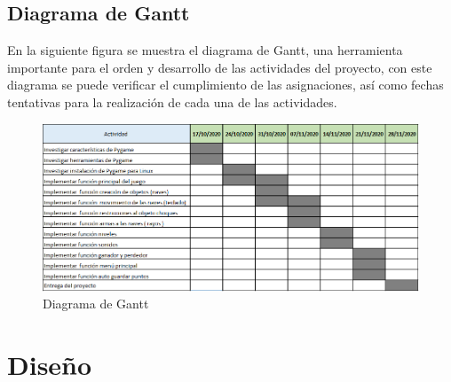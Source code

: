 \documentclass[12pt,letterpaper]{article}
\begin{document}
\subsection{Diagrama de Gantt} 
En la siguiente figura se muestra el diagrama de Gantt, una herramienta importante para el orden y desarrollo de las actividades del proyecto, con este diagrama se puede verificar el cumplimiento de las asignaciones, así como fechas tentativas para la realización de cada una de las actividades.
\begin{figure}[H]
\centering
\includegraphics[width=16cm]{Gannt.PNG}
\caption{Diagrama de Gantt}
\end{figure}


\section{Diseño}
\end{document}
